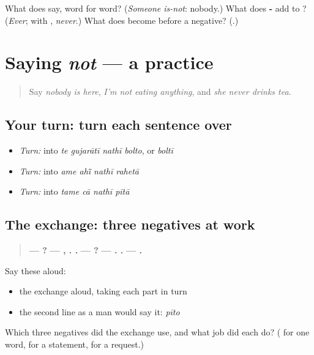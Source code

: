 \begin{tcolorbox}[breakable,colback=teal!4,colframe=teal!35!black,title={Before you move on}]
What does \textbf{ } say, word for word? (\emph{Someone is-not}: nobody.) What does \textbf{-} add to \textbf{}? (\emph{Ever}; with \textbf{}, \emph{never}.) What does \textbf{} become before a negative? (\textbf{}.)
\end{tcolorbox}
\section[Practice]{Saying \emph{not} — a practice}

\label{lesson:GU-C145-not-practice}



\begin{quote}
Say \emph{nobody is here}, \emph{I'm not eating anything}, and \emph{she never drinks tea}.
\end{quote}

\subsection*{Your turn: turn each sentence over}
\begin{itemize}
\raggedright
  \item \emph{Turn:} \textbf{   } into \emph{te gujarātī nathī bolto}, or \emph{boltī}
  \item \emph{Turn:} \textbf{   } into \emph{ame ahī̃ nathī rahetā}
  \item \emph{Turn:} \textbf{   } into \emph{tame cā nathī pītā}
\end{itemize}

\subsection*{The exchange: three negatives at work}
\begin{quote}
\textbf{— ?} \textbf{—  , .    .} \textbf{—   ?} \textbf{—   .   .} \textbf{—   .}
\end{quote}

Say these aloud:

\begin{itemize}
\raggedright
  \item the exchange aloud, taking each part in turn
  \item the second line as a man would say it: \emph{pīto}
\end{itemize}

\begin{tcolorbox}[breakable,colback=teal!4,colframe=teal!35!black,title={Before you move on}]
Which three negatives did the exchange use, and what job did each do? (\textbf{} for one word, \textbf{} for a statement, \textbf{} for a request.)
\end{tcolorbox}
